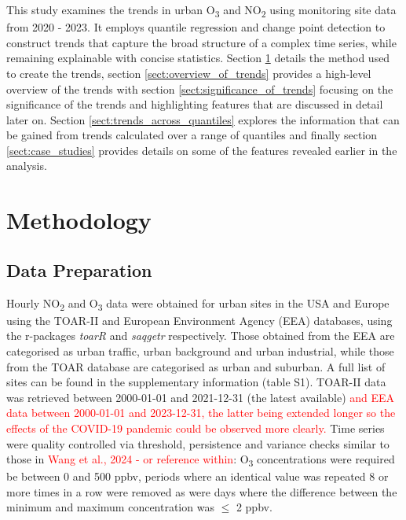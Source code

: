 \documentclass[journal abbreviation, manuscript]{copernicus}
\begin{document}
This study examines the trends in urban O\textsubscript{3} and NO\textsubscript{2} using monitoring site data from 2020 - 2023. It employs quantile regression and change point detection to construct trends that capture the broad structure of a complex time series, while remaining explainable with concise statistics. Section \ref{sect:method} details the method used to create the trends, section \ref{sect:overview_of_trends} provides a high-level overview of the trends with section \ref{sect:significance_of_trends} focusing on the significance of the trends and highlighting features that are discussed in detail later on. Section \ref{sect:trends_across_quantiles} explores the information that can be gained from trends calculated over a range of quantiles and finally section \ref{sect:case_studies} provides details on some of the features revealed earlier in the analysis. 

\section{Methodology} \label{sect:method}

\subsection{Data Preparation} \label{sect:data_prep}
Hourly NO\textsubscript{2} and O\textsubscript{3} data were obtained for urban sites in the USA and Europe using the TOAR-II \citep{toar_db} and European Environment Agency (EEA) \citep{eea_1, eea_2} databases, using the r-packages \emph{toarR} \citep{drysdale_2024_14537446} and \emph{saqgetr} \citep{saqgetr} respectively. Those obtained from the EEA are categorised as urban traffic, urban background and urban industrial, while those from the TOAR database are categorised as urban and suburban. A full list of sites can be found in the supplementary information (table S1).  TOAR-II data was retrieved between 2000-01-01 and 2021-12-31 (the latest available) \textcolor{red}{and EEA data between 2000-01-01 and 2023-12-31, the latter being extended longer so the effects of the COVID-19 pandemic could be observed more clearly.} Time series were quality controlled via threshold, persistence and variance checks similar to those in \textcolor{red}{Wang et al., 2024 - or reference within}: O\textsubscript{3} concentrations were required be between 0 and 500 ppbv, periods where an identical value was repeated 8 or more times in a row were removed as were days where the difference between the minimum and maximum concentration was $\leq$ 2 ppbv. 
\end{document}
